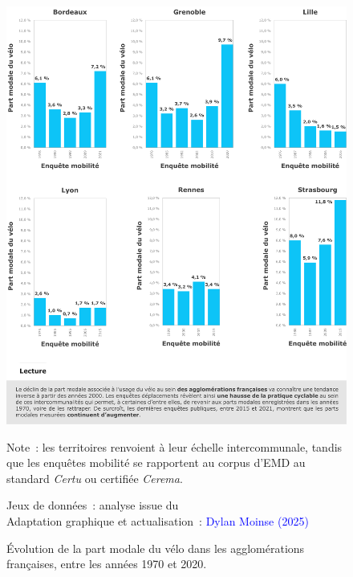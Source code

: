 \begin{refsegment}
    \begin{figure}[h!]\vspace*{4pt}
        \caption{Évolution de la part modale du vélo dans les agglomérations françaises, entre les années 1970 et 2020.}
        \label{fig-chap1:evolution-part-modale-velo}
        \centerline{\includegraphics[width=1\columnwidth]{src/Figures/Chap-1/FR_Part_modale_velo_evolution.pdf}}
        \vspace{5pt}
        \begin{flushleft}\scriptsize{
        Note~: les territoires renvoient à leur échelle intercommunale, tandis que les enquêtes mobilité se rapportent au corpus d'\acrfull{EMD} au standard \textsl{Certu} ou certifiée \textsl{Cerema}.
        }\end{flushleft}
        \begin{flushright}\scriptsize{
        Jeux de données~: analyse issue du \textcolor{blue}{\textcite[48]{certu_usagers_2013}}
        \\
        Adaptation graphique et actualisation~: \textcolor{blue}{Dylan Moinse (2025)}
        }\end{flushright}
    \end{figure}
    

\end{refsegment}
